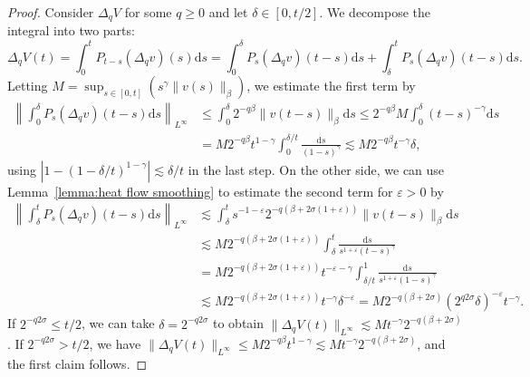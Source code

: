 \documentclass[a4paper,11pt]{article}
\newcommand{\mathd}{\mathrm{d}}
\theoremstyle{remark}
\begin{document}
\begin{proof}
  Consider $\Delta_{q} V$ for some $q \geqslant 0$ and let $\delta \in [ 0,t/2 ]$. We decompose the integral into two parts:
  \[
     \Delta_{q} V ( t ) = \int_{0}^{t} P_{t-s} ( \Delta_{q} v ) ( s ) \mathd s= \int_{0}^{\delta} P_{s} ( \Delta_{q} v ) ( t-s ) \mathd s+  \int_{\delta}^{t} P_{s} ( \Delta_{q} v ) ( t-s ) \mathd s. 
  \]
  Letting $M= \sup_{s \in [ 0,t ]} ( s^{\gamma} \| v ( s ) \|_{\beta} )$, we estimate the first term by
  \begin{align*}
     \left\| \int_{0}^{\delta} P_{s} ( \Delta_{q} v ) ( t-s ) \mathd s \right\|_{L^{\infty}} & \leqslant \int_{0}^{\delta} 2^{-q \beta} \| v ( t-s ) \|_{\beta} \mathd s \leqslant 2^{-q \beta} M \int_{0}^{\delta} ( t-s)^{- \gamma} \mathd s \\
     & =M2^{-q \beta} t^{1- \gamma} \int_{0}^{\delta /t} \frac{\mathd s}{( 1-s )^{\gamma}} \lesssim M2^{-q \beta} t^{- \gamma} \delta ,
  \end{align*}
  using $| 1- ( 1- \delta /t )^{1- \gamma} | \lesssim \delta /t$ in the last step. On the other side, we can use Lemma~\ref{lemma:heat flow smoothing} to
  estimate the second term for $\varepsilon >0$ by
  \begin{align*}
     \left\| \int_{\delta}^{t} P_{s} ( \Delta_{q} v ) ( t-s ) \mathd s \right\|_{L^{\infty}} & \lesssim \int_{\delta}^{t} s^{-1- \varepsilon} 2^{-q ( \beta +2 \sigma ( 1+ \varepsilon ) )} \| v ( t-s ) \|_{\beta} \mathd s \\
     & \lesssim M2^{-q ( \beta +2 \sigma ( 1+ \varepsilon ) )} \int_{\delta}^{t} \frac{\mathd s}{s^{1+ \varepsilon} ( t-s )^{\gamma}} \\
     & =M2^{-q ( \beta +2 \sigma ( 1+ \varepsilon ) )} t^{- \varepsilon - \gamma} \int_{\delta /t}^{1} \frac{\mathd s}{s^{1+ \varepsilon} ( 1-s )^{\gamma}} \\
     & \lesssim M2^{-q ( \beta +2 \sigma ( 1+ \varepsilon ) )} t^{- \gamma} \delta^{- \varepsilon} =M2^{-q ( \beta +2 \sigma )} ( 2^{q2 \sigma} \delta  )^{- \varepsilon} t^{- \gamma} .
  \end{align*}
  If $2^{-q2 \sigma} \leqslant t/2$, we can take $\delta =2^{-q2 \sigma}$ to
  obtain $\| \Delta_{q} V ( t ) \|_{L^{\infty}} \lesssim Mt^{- \gamma} 2^{-q (\beta +2 \sigma )}$. If $2^{-q2 \sigma} >t/2$, we have $\| \Delta_{q} V ( t ) \|_{L^{\infty}} \leqslant M2^{-q \beta} t^{1- \gamma} \lesssim Mt^{- \gamma} 2^{-q ( \beta +2 \sigma )}$, and the first claim follows.
  

\end{proof}
\end{document}

